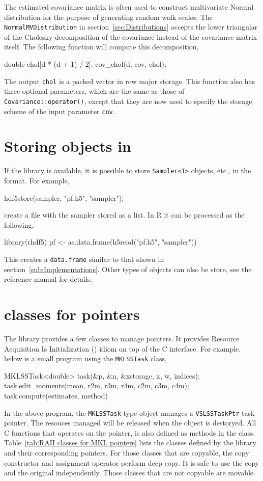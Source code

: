 The estimated covariance matrix is often used to construct multivariate Normal
distribution for the purpose of generating random walk scales. The
\verb|NormalMVDistribution| in section~\ref{sec:Distributions} accepts the
lower triangular of the Cholesky decomposition of the covariance instead of the
covariance matrix itself. The following function will compute this
decomposition,
\begin{cppcode}
  double chol[d * (d + 1) / 2];
  cov_chol(d, cov, chol);
\end{cppcode}
The output \verb|chol| is a packed vector in row major storage. This function
also has three optional parameters, which are the same as those of
\verb|Covariance::operator()|, except that they are now used to specify the
storage scheme of the input parameter \verb|cov|.

\section{Storing objects in \protect\hdf}
\label{sec:Storing objects in HDF5}

If the \hdf library is available, it is possible to store \verb|Sampler<T>|
objects, etc., in the \hdf format. For example,
\begin{cppcode}
  hdf5store(sampler, "pf.h5", "sampler");
\end{cppcode}
create a \hdf file with the sampler stored as a list. In R it can be processed
as the following,
\begin{rcode}
  library(rhdf5)
  pf <- as.data.frame(h5read("pf.h5", "sampler"))
\end{rcode}
This creates a \verb|data.frame| similar to that shown in
section~\ref{sub:Implementations}. Other types of objects can also be store,
see the reference manual for details.

\section{\protect\raii classes for \protect\mkl pointers}
\label{sec:RAII classes for MKL pointers}

The library provides a few classes to manage \mkl pointers. It provides
Resource Acquisition Is Initialization (\raii) idiom on top of the \mkl C
interface. For example, below is a small program using the \verb|MKLSSTask|
class,
\begin{cppcode}
  MKLSSTask<double> task(&p, &n, &xstorage, x, w, indices);
  task.edit_moments(mean, r2m, r3m, r4m, c2m, c3m, c4m);
  task.compute(estimates, method)
\end{cppcode}
In the above program, the \verb|MKLSSTask| type object manages a
\verb|VSLSSTaskPtr| task pointer. The resouces managed will be released when
the object is destoryed. All C functions that operates on the pointer, is also
defined as methods in the class. Table~\ref{tab:RAII classes for MKL pointers}
lists the classes defined by the library and their corresponding \mkl pointers.
For those classes that are copyable, the copy constructor and assignment
operator perform deep copy. It is safe to use the copy and the original
independently. Those classes that are not copyable are movable.

